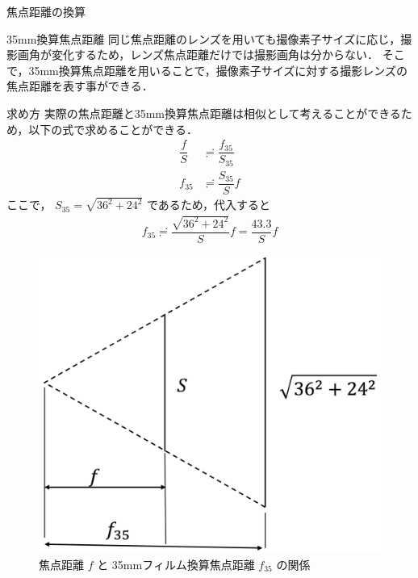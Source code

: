 \documentclass[8pt, jfont=ipaexm, t]{beamer} %
\begin{document}
\begin{frame}[allowframebreaks]{焦点距離の換算}
  \begin{block}{35mm換算焦点距離}
    同じ焦点距離のレンズを用いても撮像素子サイズに応じ，撮影画角が変化するため，レンズ焦点距離だけでは撮影画角は分からない．
    そこで，35mm換算焦点距離を用いることで，撮像素子サイズに対する撮影レンズの焦点距離を表す事ができる．
  \end{block}
  \newpage

\begin{block}{求め方}
  \tiny
  実際の焦点距離と35mm換算焦点距離は相似として考えることができるため，以下の式で求めることができる．
  \begin{align*}
    \dfrac{f}{S} &\risingdotseq \dfrac{f_{35}}{S_{35}}  \\
    f_{35} &\risingdotseq \dfrac{S_{35}}{S}f
  \end{align*}
  ここで， $S_{35} = \sqrt{36^2 + 24^2}$ であるため，代入すると
  \begin{align*}
    f_{35} \risingdotseq \dfrac{\sqrt{36^2 + 24^2}}{S} f = \dfrac{43.3}{S}f
  \end{align*}
\end{block}
\begin{figure}[H]
  \centering
  \includegraphics[scale=0.18]{figure/03.png}
  \caption{焦点距離 $f$ と 35mmフィルム換算焦点距離 $f_{35}$ の関係}
  \label{fig:03}
\end{figure}
\end{frame}
\end{document}
